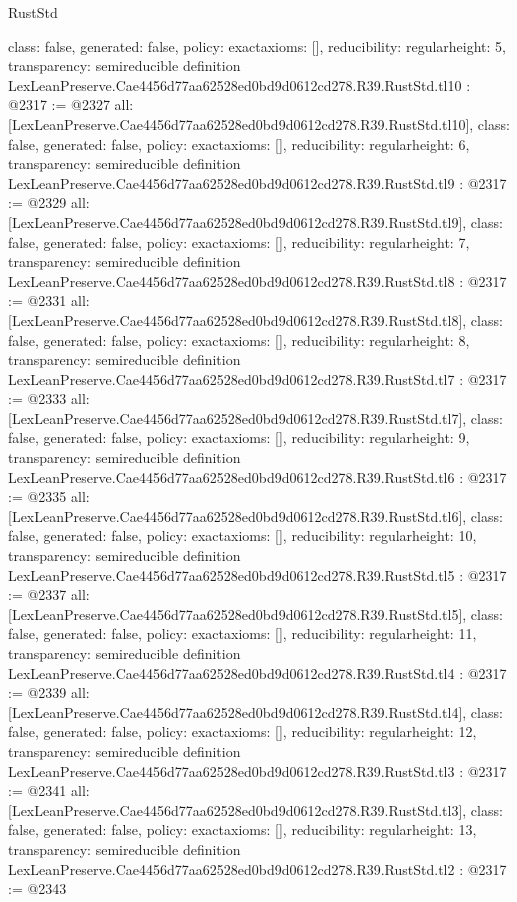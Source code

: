\begin{lexlean}{RustStd}
\begin{coremodule}
{  class: false,
  generated: false,
  policy: exact{axioms: []},
  reducibility: regular{height: 5},
  transparency: semireducible
}
definition LexLeanPreserve.Cae4456d77aa62528ed0bd9d0612cd278.R39.RustStd.tl10 : @2317 := @2327 {
  all: [LexLeanPreserve.Cae4456d77aa62528ed0bd9d0612cd278.R39.RustStd.tl10],
  class: false,
  generated: false,
  policy: exact{axioms: []},
  reducibility: regular{height: 6},
  transparency: semireducible
}
definition LexLeanPreserve.Cae4456d77aa62528ed0bd9d0612cd278.R39.RustStd.tl9 : @2317 := @2329 {
  all: [LexLeanPreserve.Cae4456d77aa62528ed0bd9d0612cd278.R39.RustStd.tl9],
  class: false,
  generated: false,
  policy: exact{axioms: []},
  reducibility: regular{height: 7},
  transparency: semireducible
}
definition LexLeanPreserve.Cae4456d77aa62528ed0bd9d0612cd278.R39.RustStd.tl8 : @2317 := @2331 {
  all: [LexLeanPreserve.Cae4456d77aa62528ed0bd9d0612cd278.R39.RustStd.tl8],
  class: false,
  generated: false,
  policy: exact{axioms: []},
  reducibility: regular{height: 8},
  transparency: semireducible
}
definition LexLeanPreserve.Cae4456d77aa62528ed0bd9d0612cd278.R39.RustStd.tl7 : @2317 := @2333 {
  all: [LexLeanPreserve.Cae4456d77aa62528ed0bd9d0612cd278.R39.RustStd.tl7],
  class: false,
  generated: false,
  policy: exact{axioms: []},
  reducibility: regular{height: 9},
  transparency: semireducible
}
definition LexLeanPreserve.Cae4456d77aa62528ed0bd9d0612cd278.R39.RustStd.tl6 : @2317 := @2335 {
  all: [LexLeanPreserve.Cae4456d77aa62528ed0bd9d0612cd278.R39.RustStd.tl6],
  class: false,
  generated: false,
  policy: exact{axioms: []},
  reducibility: regular{height: 10},
  transparency: semireducible
}
definition LexLeanPreserve.Cae4456d77aa62528ed0bd9d0612cd278.R39.RustStd.tl5 : @2317 := @2337 {
  all: [LexLeanPreserve.Cae4456d77aa62528ed0bd9d0612cd278.R39.RustStd.tl5],
  class: false,
  generated: false,
  policy: exact{axioms: []},
  reducibility: regular{height: 11},
  transparency: semireducible
}
definition LexLeanPreserve.Cae4456d77aa62528ed0bd9d0612cd278.R39.RustStd.tl4 : @2317 := @2339 {
  all: [LexLeanPreserve.Cae4456d77aa62528ed0bd9d0612cd278.R39.RustStd.tl4],
  class: false,
  generated: false,
  policy: exact{axioms: []},
  reducibility: regular{height: 12},
  transparency: semireducible
}
definition LexLeanPreserve.Cae4456d77aa62528ed0bd9d0612cd278.R39.RustStd.tl3 : @2317 := @2341 {
  all: [LexLeanPreserve.Cae4456d77aa62528ed0bd9d0612cd278.R39.RustStd.tl3],
  class: false,
  generated: false,
  policy: exact{axioms: []},
  reducibility: regular{height: 13},
  transparency: semireducible
}
definition LexLeanPreserve.Cae4456d77aa62528ed0bd9d0612cd278.R39.RustStd.tl2 : @2317 := @2343 {
}
\end{coremodule}
\end{lexlean}
